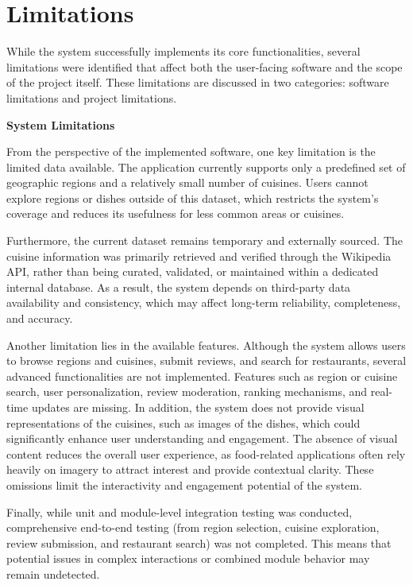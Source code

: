 \section{Limitations}

While the system successfully implements its core functionalities, several limitations were identified that affect both the user-facing software and the scope of the project itself.
These limitations are discussed in two categories: software limitations and project limitations.

\textbf{System Limitations}

From the perspective of the implemented software, one key limitation is the limited data available. 
The application currently supports only a predefined set of geographic regions and a relatively small number of cuisines. 
Users cannot explore regions or dishes outside of this dataset, which restricts the system's coverage 
and reduces its usefulness for less common areas or cuisines.

Furthermore, the current dataset remains temporary and externally sourced. 
The cuisine information was primarily retrieved and verified through the Wikipedia API, 
rather than being curated, validated, or maintained within a dedicated internal database. 
As a result, the system depends on third-party data availability and consistency, 
which may affect long-term reliability, completeness, and accuracy.

Another limitation lies in the available features. 
Although the system allows users to browse regions and cuisines, submit reviews, and search for restaurants, 
several advanced functionalities are not implemented. 
Features such as region or cuisine search, user personalization, review moderation, ranking mechanisms, 
and real-time updates are missing. 
In addition, the system does not provide visual representations of the cuisines, 
such as images of the dishes, which could significantly enhance user understanding 
and engagement. 
The absence of visual content reduces the overall user experience, 
as food-related applications often rely heavily on imagery to attract interest 
and provide contextual clarity. 
These omissions limit the interactivity and engagement potential of the system.

Finally, while unit and module-level integration testing was conducted, 
comprehensive end-to-end testing (from region selection, cuisine exploration, 
review submission, and restaurant search) was not completed.
This means that potential issues in complex interactions or combined module behavior may remain undetected.


